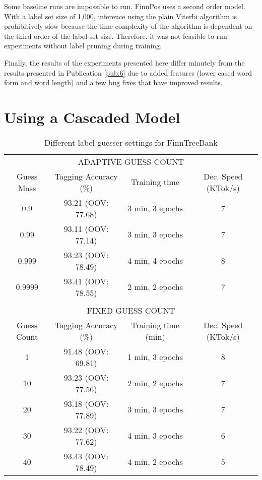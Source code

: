 Some baseline runs are impossible to run. FinnPos uses a second order
model. With a label set size of 1,000, inference using the plain
Viterbi algorithm is prohibitively slow because the time complexity of
the algorithm is dependent on the third order of the label set size.
Therefore, it was not feasible to run experiments without label
pruning during training.

Finally, the results of the experiments presented here differ minutely
from the results presented in Publication \ref{pub:6} due to added
features (lower cased word form and word length) and a few bug fixes
that have improved results.

\section{Using a Cascaded Model}

\begin{table}[htb!]
\begin{center}
\begin{tabular}{c|c|c|c}
\multicolumn{4}{c}{{\small\uppercase{Adaptive Guess Count}}}\\
\noalign{\smallskip}
\hline
Guess Mass & Tagging Accuracy (\%) & Training time & Dec. Speed (KTok/s)\\
\hline
0.9\phantom{999}        & 93.21 (OOV: 77.68) & 3 min, 3 epochs &   7          \\
0.99\phantom{99}       & 93.11 (OOV: 77.14) & 3 min, 3 epochs & 7            \\
0.999\phantom{9}      & 93.23 (OOV: 78.49) & 4 min, 4 epochs            & 8            \\
0.9999      & 93.41 (OOV: 78.55) & 2 min, 2 epochs            & 7            \\
\multicolumn{4}{c}{ }\\%
\multicolumn{4}{c}{{\small\uppercase{Fixed Guess Count}}}\\
\noalign{\smallskip}
\hline
Guess Count & Tagging Accuracy (\%) & Training time (min) & Dec. Speed (KTok/s) \\
\hline
1\phantom{0}        & 91.48 (OOV: 69.81)           & 1 min, 3 epochs            & 8            \\
10       & 93.23 (OOV: 77.56)           & 2 min, 2 epochs            & 7            \\
20       & 93.18 (OOV: 77.89)           & 3 min, 3 epochs            & 7            \\
30       & 93.22 (OOV: 77.62)           & 4 min, 3 epochs            & 6            \\
40       & 93.43 (OOV: 78.49)           & 4 min, 2 epochs            & 5            \\
\end{tabular}
\caption{Different label guesser settings for FinnTreeBank}
\end{center}
\end{table}


